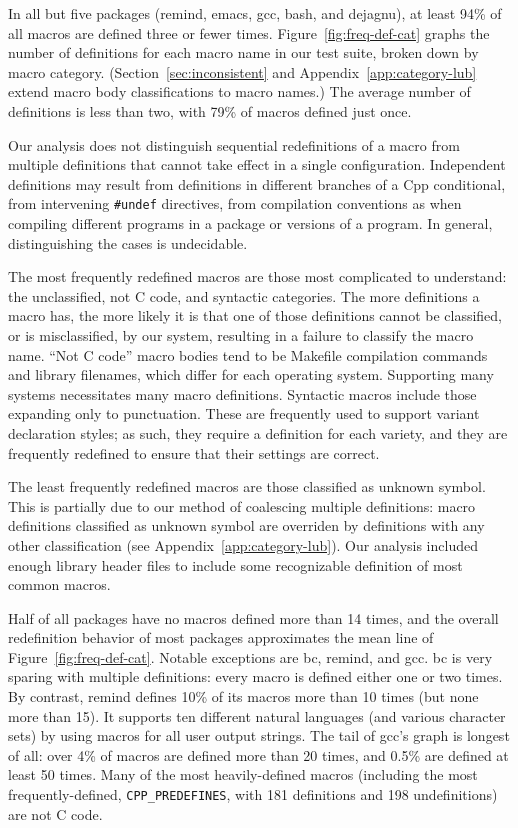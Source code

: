 \documentclass[10pt]{article}
\newcommand{\pkg}[1]{\textsf{#1}}
\begin{document}
In all but five packages (\pkg{remind}, \pkg{emacs}, \pkg{gcc}, \pkg{bash},
and \pkg{dejagnu}), at least 94\% of all macros are defined three or fewer
times.  Figure~\ref{fig:freq-def-cat} graphs the number of definitions for
each macro name in our test suite, broken down by macro category.
(Section~\ref{sec:inconsistent} and Appendix~\ref{app:category-lub} extend
macro body classifications to macro names.)  The average number of
definitions is less than two, with 79\% of macros defined just once.

Our analysis does not distinguish sequential redefinitions of a macro from
multiple definitions that cannot take effect in a single configuration.
Independent definitions may result from definitions in different branches
of a Cpp conditional, from intervening {\tt \#undef} directives, from
compilation conventions as when compiling different programs in a package
or versions of a program.  In general, distinguishing the cases is
undecidable.

The most frequently redefined macros are those most complicated to
understand: the unclassified, not C code, and syntactic categories.  The
more definitions a macro has, the more likely it is that one of those
definitions cannot be classified, or is misclassified, by our system,
resulting in a failure to classify the macro name.  ``Not C code'' macro
bodies tend to be Makefile compilation commands and library filenames,
which differ for each operating system.  Supporting many systems
necessitates many macro definitions.  Syntactic macros include those
expanding only to punctuation.  These are frequently used to support
variant declaration styles; as such, they require a definition for each
variety, and they are frequently redefined to ensure that their settings
are correct.

The least frequently redefined macros are those classified as unknown
symbol.  This is partially due to our method of coalescing multiple
definitions:  macro definitions classified as unknown symbol are overriden
by definitions with any other classification (see
Appendix~\ref{app:category-lub}).  Our
analysis included enough library header files to include some
recognizable definition of most common macros.

Half of all packages have no macros defined more than 14 times, and the
overall redefinition behavior of most packages approximates the mean line
of Figure~\ref{fig:freq-def-cat}.  Notable exceptions are \pkg{bc},
\pkg{remind}, and \pkg{gcc}.  \pkg{bc} is very sparing with multiple
definitions: every macro is defined either one or two times.  By contrast, 
\pkg{remind} defines 10\% of its macros more than 10 times (but none more
than 15).  It supports ten different natural languages (and various character
sets) by using macros for all user output strings.  The tail of \pkg{gcc}'s
graph is longest of all: over 4\% of macros are defined more than 20 times,
and 0.5\% are defined at least 50 times.  Many of the most heavily-defined
macros (including the most frequently-defined, \verb|CPP_PREDEFINES|, with
181 definitions and 198 undefinitions) are not C code.
\end{document}
